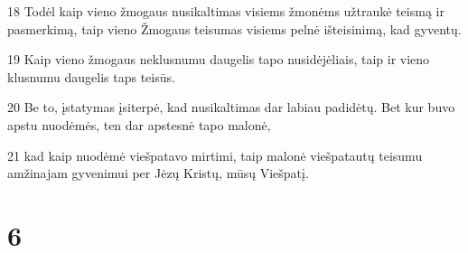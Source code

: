 \par 18 Todėl kaip vieno žmogaus nusikaltimas visiems žmonėms užtraukė teismą ir pasmerkimą, taip vieno Žmogaus teisumas visiems pelnė išteisinimą, kad gyventų. 
\par 19 Kaip vieno žmogaus neklusnumu daugelis tapo nusidėjėliais, taip ir vieno klusnumu daugelis taps teisūs. 
\par 20 Be to, įstatymas įsiterpė, kad nusikaltimas dar labiau padidėtų. Bet kur buvo apstu nuodėmės, ten dar apstesnė tapo malonė, 
\par 21 kad kaip nuodėmė viešpatavo mirtimi, taip malonė viešpatautų teisumu amžinajam gyvenimui per Jėzų Kristų, mūsų Viešpatį.


\chapter{6}


